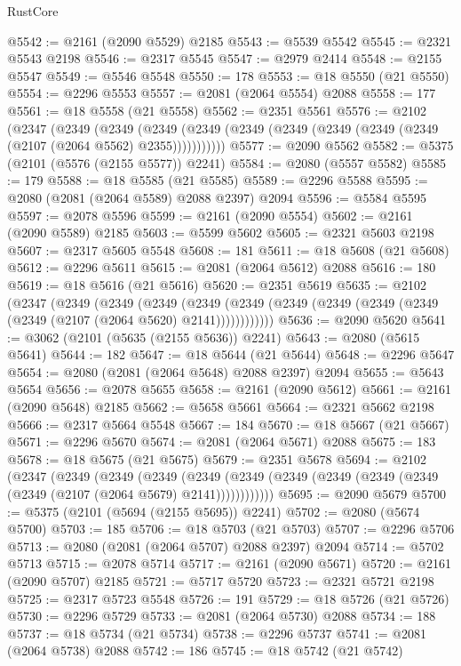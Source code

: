 \begin{lexlean}{RustCore}
\begin{coremodule}
@5542 := @2161 (@2090 @5529) @2185
@5543 := @5539 @5542
@5545 := @2321 @5543 @2198
@5546 := @2317 @5545
@5547 := @2979 @2414
@5548 := @2155 @5547
@5549 := @5546 @5548
@5550 := 178
@5553 := @18 @5550 (@21 @5550)
@5554 := @2296 @5553
@5557 := @2081 (@2064 @5554) @2088
@5558 := 177
@5561 := @18 @5558 (@21 @5558)
@5562 := @2351 @5561
@5576 := @2102
    (@2347
      (@2349
        (@2349
          (@2349 (@2349 (@2349 (@2349 (@2349 (@2349 (@2349 (@2107 (@2064 @5562) @2355)))))))))))
@5577 := @2090 @5562
@5582 := @5375 (@2101 (@5576 (@2155 @5577)) @2241)
@5584 := @2080 (@5557 @5582)
@5585 := 179
@5588 := @18 @5585 (@21 @5585)
@5589 := @2296 @5588
@5595 := @2080 (@2081 (@2064 @5589) @2088 @2397) @2094
@5596 := @5584 @5595
@5597 := @2078 @5596
@5599 := @2161 (@2090 @5554)
@5602 := @2161 (@2090 @5589) @2185
@5603 := @5599 @5602
@5605 := @2321 @5603 @2198
@5607 := @2317 @5605 @5548
@5608 := 181
@5611 := @18 @5608 (@21 @5608)
@5612 := @2296 @5611
@5615 := @2081 (@2064 @5612) @2088
@5616 := 180
@5619 := @18 @5616 (@21 @5616)
@5620 := @2351 @5619
@5635 := @2102
    (@2347
      (@2349
        (@2349
          (@2349
            (@2349 (@2349 (@2349 (@2349 (@2349 (@2349 (@2349 (@2107 (@2064 @5620) @2141))))))))))))
@5636 := @2090 @5620
@5641 := @3062 (@2101 (@5635 (@2155 @5636)) @2241)
@5643 := @2080 (@5615 @5641)
@5644 := 182
@5647 := @18 @5644 (@21 @5644)
@5648 := @2296 @5647
@5654 := @2080 (@2081 (@2064 @5648) @2088 @2397) @2094
@5655 := @5643 @5654
@5656 := @2078 @5655
@5658 := @2161 (@2090 @5612)
@5661 := @2161 (@2090 @5648) @2185
@5662 := @5658 @5661
@5664 := @2321 @5662 @2198
@5666 := @2317 @5664 @5548
@5667 := 184
@5670 := @18 @5667 (@21 @5667)
@5671 := @2296 @5670
@5674 := @2081 (@2064 @5671) @2088
@5675 := 183
@5678 := @18 @5675 (@21 @5675)
@5679 := @2351 @5678
@5694 := @2102
    (@2347
      (@2349
        (@2349
          (@2349
            (@2349 (@2349 (@2349 (@2349 (@2349 (@2349 (@2349 (@2107 (@2064 @5679) @2141))))))))))))
@5695 := @2090 @5679
@5700 := @5375 (@2101 (@5694 (@2155 @5695)) @2241)
@5702 := @2080 (@5674 @5700)
@5703 := 185
@5706 := @18 @5703 (@21 @5703)
@5707 := @2296 @5706
@5713 := @2080 (@2081 (@2064 @5707) @2088 @2397) @2094
@5714 := @5702 @5713
@5715 := @2078 @5714
@5717 := @2161 (@2090 @5671)
@5720 := @2161 (@2090 @5707) @2185
@5721 := @5717 @5720
@5723 := @2321 @5721 @2198
@5725 := @2317 @5723 @5548
@5726 := 191
@5729 := @18 @5726 (@21 @5726)
@5730 := @2296 @5729
@5733 := @2081 (@2064 @5730) @2088
@5734 := 188
@5737 := @18 @5734 (@21 @5734)
@5738 := @2296 @5737
@5741 := @2081 (@2064 @5738) @2088
@5742 := 186
@5745 := @18 @5742 (@21 @5742)

\end{coremodule}
\end{lexlean}

